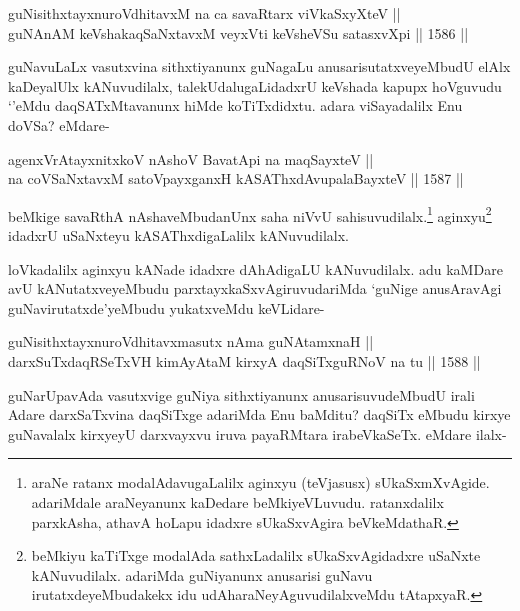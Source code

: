 
\begin{shl}
guNisithxtayxnuroVdhitavxM na ca savaRtarx viVkaSxyXteV || \\
guNAnAM keVshakaqSaNxtavxM veyxVti keVsheVSu satasxvXpi ||  1586 ||  
\end{shl}

\begin{artha}
guNavuLaLx vasutxvina sithxtiyanunx guNagaLu anusarisutatxveyeMbudU elAlx kaDeyalUlx kANuvudilalx, talekUdalugaLidadxrU keVshada kapupx hoVguvudu `\stext'eMdu daqSATxMtavanunx hiMde koTiTxdidxtu. adara viSayadalilx Enu doVSa? eMdare-
\end{artha}

\begin{shl}
agenxVrAtayxnitxkoV nAshoV BavatA\s pi na maqSayxteV || \\
na coVSaNxtavxM satoV\s payxganxH kASAThxdAvupalaBayxteV ||  1587 ||  
\end{shl}

\begin{artha}
beMkige savaRthA nAshaveMbudanUnx saha niVvU sahisuvudilalx.\footnote{araNe ratanx modalAdavugaLalilx aginxyu (teVjasusx) sUkaSxmXvAgide. adariMdale araNeyanunx kaDedare beMkiyeVLuvudu. ratanxdalilx parxkAsha, athavA hoLapu idadxre sUkaSxvAgira beVkeMdathaR.} aginxyu\footnote{beMkiyu kaTiTxge modalAda sathxLadalilx sUkaSxvAgidadxre uSaNxte kANuvudilalx. adariMda guNiyanunx anusarisi guNavu irutatxdeyeMbudakekx idu udAharaNeyAguvudilalxveMdu tAtapxyaR.} idadxrU uSaNxteyu kASAThxdigaLalilx kANuvudilalx.
\end{artha}

\begin{artha}
loVkadalilx aginxyu kANade idadxre dAhAdigaLU kANuvudilalx. adu kaMDare avU kANutatxveyeMbudu parxtayxkaSxvAgiruvudariMda `guNige anusAravAgi guNavirutatxde'yeMbudu yukatxveMdu keVLidare-
\end{artha}

\begin{shl}
guNisithxtayxnuroVdhitavxmasutx nAma guNAtamxnaH || \\
darxSuTxdaqRSeTxVH kimAyAtaM kirxyA daqSiTxguRNoV na tu ||  1588 ||  
\end{shl}

\begin{artha}
guNarUpavAda vasutxvige guNiya sithxtiyanunx anusarisuvudeMbudU irali Adare darxSaTxvina daqSiTxge adariMda Enu baMditu? daqSiTx eMbudu kirxye guNavalalx kirxyeyU darxvayxvu iruva payaRMtara irabeVkaSeTx. eMdare ilalx-
\end{artha}

